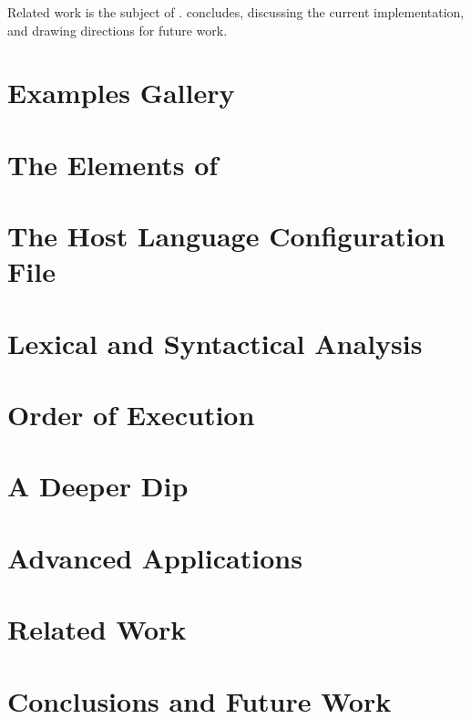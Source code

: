\documentclass[12pt]{book}
\begin{document}
Related work is the subject of . 
concludes, discussing the current implementation, and drawing 
directions for future
work.

\chapter{Examples Gallery}
\label{chapter:gallery}


\chapter{The Elements of \Lola}
\label{chapter:elements}


\chapter{The Host Language Configuration File}
\label{chapter:tokens}


\chapter{Lexical and Syntactical Analysis}
\label{chapter:builder}


\chapter{Order of Execution}
\label{chapter:order-or-execution}

\chapter{A Deeper Dip}
\label{chapter:deeper-dip}


\chapter{Advanced Applications}
\label{chapter:advanced}


\chapter{Related Work}
\label{chapter:related-work}


\chapter{Conclusions and Future Work}
\label{chapter:conclusions}


\bibs
\appendix
\end{document}
